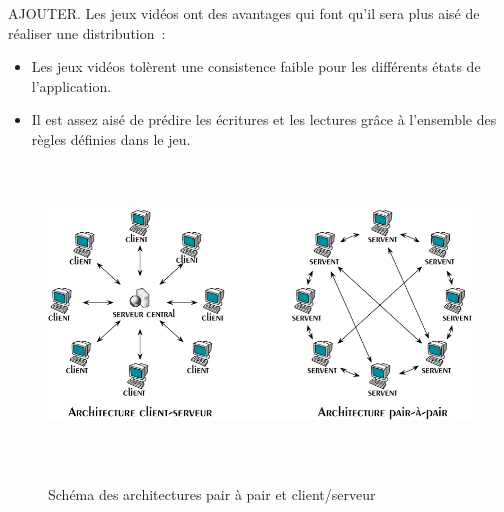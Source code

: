 	AJOUTER. Les jeux vidéos ont des avantages qui font qu'il sera plus aisé de réaliser une distribution~\cite{1267692}:
	\begin{itemize}
		\renewcommand{\labelitemi}{$\bullet$}
		\item Les jeux vidéos tolèrent une consistence faible pour les différents états de l'application.
		\item Il est assez aisé de prédire les écritures et les lectures grâce à l'ensemble des règles définies dans le jeu. 
	\end{itemize}
	\vspace{1.5cm}
	\begin{figure}[!h]
	\centering
	\includegraphics[width=15cm,height=8cm]{../Images/p2p-85145.png}\\
	\caption{Schéma des architectures pair à pair et client/serveur}
	\label{P2P/ClServ}
	\end{figure}
